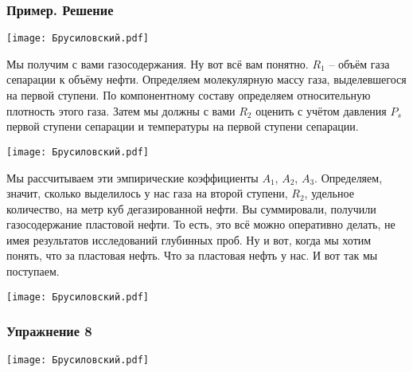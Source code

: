 \documentclass[main.tex]{subfiles}
\begin{document}
\subsubsection{Пример. Решение}

\begin{center}
\texttt{[image: Брусиловский.pdf]}
\end{center}

Мы получим с вами газосодержания.
Ну вот всё вам понятно.
$R_1$ -- объём газа сепарации к объёму нефти.
Определяем молекулярную массу газа, выделевшегося на первой ступени.
По компонентному составу определяем относительную плотность этого газа.
Затем мы должны с вами $R_2$ оценить с учётом давления $P_s$ первой ступени сепарации и температуры на первой ступени сепарации.

\begin{center}
\texttt{[image: Брусиловский.pdf]}
\end{center}

Мы рассчитываем эти эмпирические коэффициенты $A_1$, $A_2$, $A_3$.
Определяем, значит, сколько выделилось у нас газа на второй ступени, $R_2$, удельное количество, на метр куб дегазированной нефти.
Вы суммировали, получили газосодержание пластовой нефти.
То есть, это всё можно оперативно делать, не имея результатов исследований глубинных проб.
Ну и вот, когда мы хотим понять, что за пластовая нефть.
Что за пластовая нефть у нас.
И вот так мы поступаем.

\begin{center}
\texttt{[image: Брусиловский.pdf]}
\end{center}

\subsubsection{Упражнение 8}

\begin{center}
\texttt{[image: Брусиловский.pdf]}
\end{center}
\end{document}
